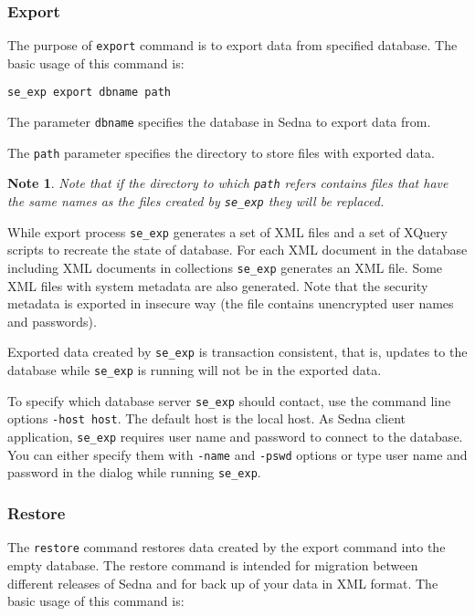 \documentclass[a4paper,12pt]{article}
\newtheorem{note}{Note}
\begin{document}
\subsubsection*{Export}
The purpose of \verb!export! command is to export data from specified database. The basic usage 
of this command is:

\begin{verbatim}
se_exp export dbname path
\end{verbatim}

The parameter \verb!dbname! specifies the database in Sedna to export data from. 

The \verb!path! parameter specifies the directory to store files with exported data. 

\begin{note}
Note that if the directory to which \verb!path! refers contains files that have the same names as the files created by \verb!se_exp! they will be replaced. 
\end{note}

While export process \verb!se_exp! generates a set of XML files and a set of XQuery scripts to 
recreate the state of database. For each XML document in the database including XML documents in
collections \verb!se_exp! generates an XML file. Some XML files with system metadata are also
generated. Note that the security metadata is exported in insecure way (the file contains 
unencrypted user names and passwords).

Exported data created by \verb!se_exp! is transaction consistent, that is, updates to the database 
while \verb!se_exp! is running will not be in the exported data. 

To specify which database server \verb!se_exp! should contact, use the command line options 
\verb!-host host!. The default host is the local host. As Sedna client application, \verb!se_exp! 
requires user name and password to connect to the database. You can either specify them with 
\verb!-name! and \verb!-pswd! options or type user name and password in the dialog while 
running \verb!se_exp!.




\subsubsection*{Restore}

The \verb!restore! command restores data created by the export command into the empty database.
The restore command is intended for migration between different releases of Sedna and for back
up of your data in XML format. The basic usage of this command is:
\end{document}
